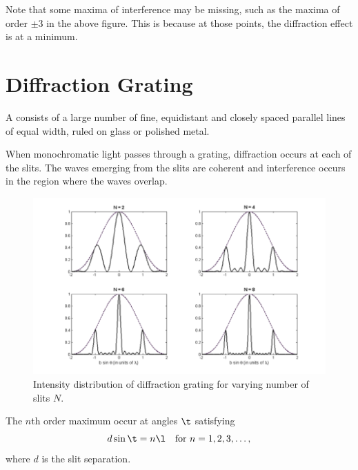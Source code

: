 Note that some maxima of interference may be missing, such as the maxima of order $\pm 3$ in the above figure. This is because at those points, the diffraction effect is at a minimum.

\section{Diffraction Grating}

A  consists of a large number of fine, equidistant and closely spaced parallel lines of equal width, ruled on glass or polished metal.

When monochromatic light passes through a grating, diffraction occurs at each of the slits. The waves emerging from the slits are coherent and interference occurs in the region where the waves overlap.

\begin{figure}[H]
    \centering
    \includegraphics[scale=0.5]{media/Diffraction Grating.png}
    \caption{Intensity distribution of diffraction grating for varying number of slits $N$.\protect\footnotemark}
\end{figure}

\begin{proposition}
    The $n$th order maximum occur at angles $\t$ satisfying \[d \sin \t = n \l \quad \text{for $n = 1, 2, 3, \dots$},\] where $d$ is the slit separation.
\end{proposition}